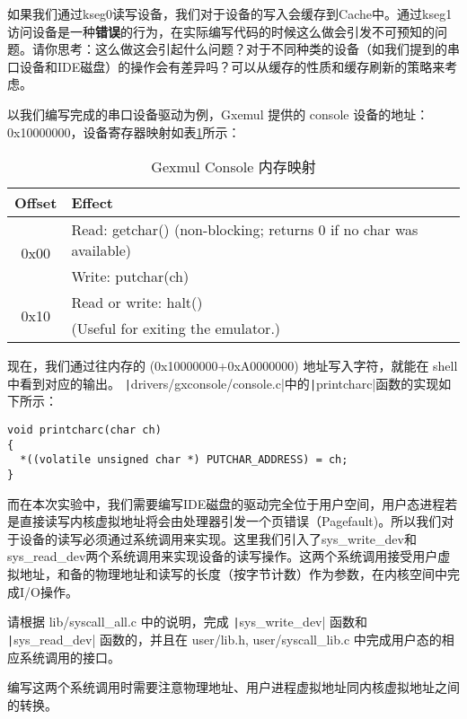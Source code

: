 \begin{thinking}\label{think-fs-cache}

如果我们通过kseg0读写设备，我们对于设备的写入会缓存到Cache中。通过kseg1访问设备是一种\textbf{错误}的行为，在实际编写代码的时候这么做会引发不可预知的问题。请你思考：这么做这会引起什么问题？对于不同种类的设备（如我们提到的串口设备和IDE磁盘）的操作会有差异吗？可以从缓存的性质和缓存刷新的策略来考虑。
\end{thinking}

以我们编写完成的串口设备驱动为例，Gxemul 提供的 console 设备的地址：0x10000000，设备寄存器映射如表\ref{lab5-table-console-mem-map}所示：

\begin{table}[htbp]
\caption{Gexmul Console 内存映射}\label{lab5-table-console-mem-map}
\centering
\begin{tabular}{|c|l|}
  \hline
    Offset & Effect \\
  \hline
  \multirow{2}{*}{0x00} & Read: getchar() (non-blocking; returns 0 if no char was available) \\
  \cline{2-2}
    & Write: putchar(ch) \\
  \hline
    \multirow{2}{*}{0x10} & Read or write: halt() \\
  \cline{2-2}
    & (Useful for exiting the emulator.) \\
  \hline
\end{tabular}
\end{table}

现在，我们通过往内存的 (0x10000000+0xA0000000) 地址写入字符，就能在 shell 中看到对应的输出。
\texttt|drivers/gxconsole/console.c|中的\texttt|printcharc|函数的实现如下所示：

\begin{verbatim}
void printcharc(char ch)
{
  *((volatile unsigned char *) PUTCHAR_ADDRESS) = ch;
}
\end{verbatim}

而在本次实验中，我们需要编写IDE磁盘的驱动完全位于用户空间，用户态进程若是直接读写内核虚拟地址将会由处理器引发一个页错误（Pagefault)。所以我们对于设备的读写必须通过系统调用来实现。这里我们引入了sys\_write\_dev和sys\_read\_dev两个系统调用来实现设备的读写操作。这两个系统调用接受用户虚拟地址，和备的物理地址和读写的长度（按字节计数）作为参数，在内核空间中完成I/O操作。

\begin{exercise}
请根据 lib/syscall\_all.c 中的说明，完成 \texttt|sys_write_dev| 函数和 \texttt|sys_read_dev| 函数的，并且在 user/lib.h, user/syscall\_lib.c 中完成用户态的相应系统调用的接口。

编写这两个系统调用时需要注意物理地址、用户进程虚拟地址同内核虚拟地址之间的转换。
\end{exercise}

